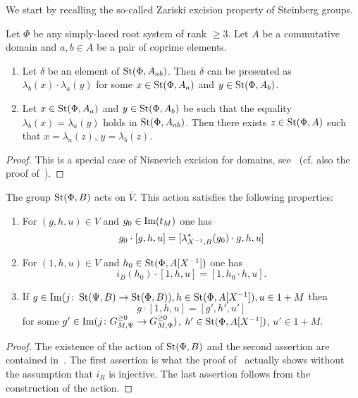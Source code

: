 We start by recalling the so-called Zariski excision property of Steinberg groups.
\begin{lemma} \label{lem:zariski-glueing}
Let $\Phi$ be any simply-laced root system of rank $\geq 3$.
Let $A$ be a commutative domain and $a, b \in A$ be a pair of coprime elements.
\begin{enumerate}
    \item Let $\delta$ be an element of $\operatorname{St}(\Phi, A_{ab})$.
    Then $\delta$ can be presented as $\lambda_b(x) \cdot \lambda_a(y)$ for some
    $x  \in \operatorname{St}(\Phi, A_a)$ and $y \in \operatorname{St}(\Phi, A_b)$.
    \item  Let $x \in \operatorname{St}(\Phi, A_a)$ and $y \in \operatorname{St}(\Phi, A_b)$ be such that the equality $\lambda_b(x) = \lambda_a(y)$ holds in $\operatorname{St}(\Phi, A_{ab})$.
    Then there exists $z \in \operatorname{St}(\Phi, A)$ such that $x = \lambda_a(z)$, $y = \lambda_b(z)$.
\end{enumerate}
\end{lemma}
\begin{proof}
    This is a special case of Nisnevich excision for domains, see~\cite[Proposition~4.5]{LSV2}
    (cf. also the proof of~\cite[Lemma~2.6]{LSV2}).
\end{proof}



\begin{prop} \label{prop:horrocks-main} The group $\operatorname{St}(\Phi, B)$ acts on $\overline{V}$.
This action satisfies the following properties:
\begin{enumerate}
    \item For $(g, h, u) \in V$ and $g_0 \in \operatorname{Im}(t_M)$ one has
    \[g_0 \cdot [g, h, u] = [\lambda_{X^{-1}, B}^* (g_0) \cdot g, h, u]\]
    \item For $(1, h, u) \in V$ and $h_0 \in \operatorname{St}(\Phi, A[X^{-1}])$ one has
    \[ i_B(h_0) \cdot [1, h, u] = [1, h_0 \cdot h, u].\]
    \item If $g \in \operatorname{Im}(j\colon \operatorname{St}(\Psi, B) \to \operatorname{St}(\Phi, B)), h \in \operatorname{St}(\Phi, A[X^{-1}]), u \in 1 + M$ then
    \[ g \cdot [1, h, u] = [g', h', u']\] for some $g' \in \operatorname{Im}(j\colon G_{M, \Psi}^{\geq 0} \to G_{M, \Phi}^{\geq 0})$, $h' \in \operatorname{St}(\Phi, A[X^{-1}])$, $u'\in 1 + M$.
\end{enumerate}
\end{prop}
\begin{proof}
    The existence of the action of $\operatorname{St}(\Phi, B)$ and the second assertion are contained in~\cite[Proposition~5.39]{LS20}.
    The first assertion is what the proof of~\cite[Lemma~5.41]{LS20} actually shows without the assumption that $i_R$ is injective.
    The last assertion follows from the construction of the action. %
\end{proof}

